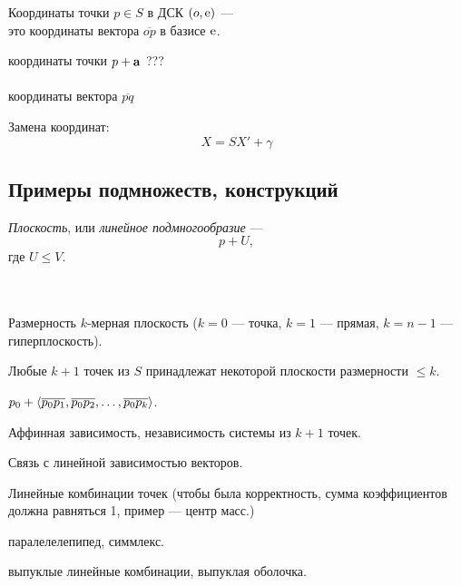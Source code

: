 \otstup

Координаты точки $p\in S$ в ДСК
$(o, \mathrm{e}) $ --- \\
это координаты вектора $\overline{op}$ в базисе $\mathrm{e}$.


\otstup

координаты точки $p+\mathbf{a}$ ???
\\
\\
координаты вектора  $\overline{pq}$ 

\otstup

Замена координат: $$X=SX'+\gamma$$

\otstup

\subsection{Примеры подмножеств, конструкций}


{\it Плоскость}, или {\it линейное подмногообразие} ---
$$p+U, $$
где $U\leq V$.

\\
\\

Размерность 
$k$-мерная плоскость ($k=0$ --- точка, $k=1$ --- прямая, $k=n-1$ --- гиперплоскость). 

\otstup


Любые $k+1$ точек из $S$ принадлежат некоторой плоскости размерности $\leq k$.

$p_0 + \langle \overline{p_0p_1}, \overline{p_0p_2}, \ldots, \overline{p_0p_k} \rangle$.


\otstup

{\footnotesize

Аффинная зависимость, независимость системы из $k+1$ точек.

Связь с линейной зависимостью векторов.

\otstup

Линейные комбинации точек 
(чтобы была корректность, сумма коэффициентов должна равняться 1, пример --- центр масс.)


\otstup
паралелелепипед, симмлекс.

выпуклые линейные комбинации, выпуклая оболочка.
}
